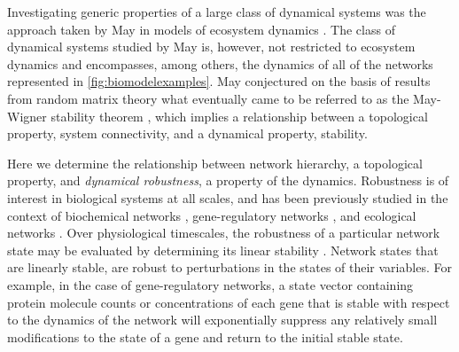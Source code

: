 Investigating generic properties of a large class of dynamical systems was the approach taken by May in models of ecosystem dynamics \cite{Gardner1970,May1972}. The class of dynamical systems studied by May is, however, not restricted to ecosystem dynamics and encompasses, among others, the dynamics of all of the networks represented in \ref{fig:biomodelexamples}. May conjectured on the basis of results from random matrix theory what eventually came to be referred to as the May-Wigner stability theorem \cite{Cohen1984,May1972a,McMurtrie1975,Radius2014,Majumdar2014}, which implies a relationship between a topological property, system connectivity, and a dynamical property, stability.


Here we determine the relationship between network hierarchy, a topological property, and \emph{dynamical robustness}, a property of the dynamics. Robustness is of interest in biological systems at all scales, and has been previously studied in the context of biochemical networks \cite{Alon1999,Shinar2010}, gene-regulatory networks \cite{VanNimwegen1999,Siegal2002,Draghi2010,Wagner2013}, and ecological networks \cite{Rohr2014}. Over physiological timescales, the robustness of a particular network state may be evaluated by determining its linear stability \cite{Davis1962}. Network states that are linearly stable, are robust to perturbations in the states of their variables. For example, in the case of gene-regulatory networks, a state vector containing protein molecule counts or concentrations of each gene that is stable with respect to the dynamics of the network will exponentially suppress any relatively small modifications to the state of a gene and return to the initial stable state.

